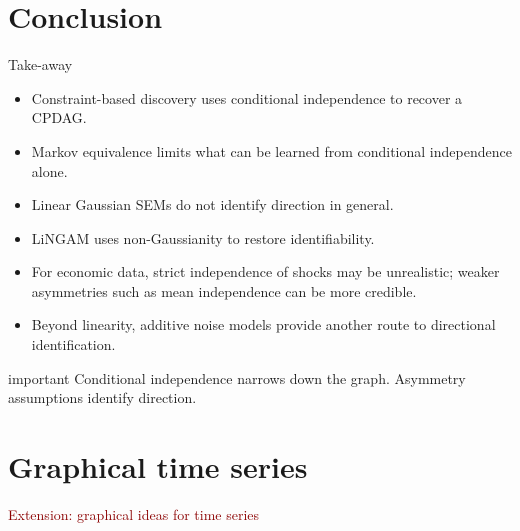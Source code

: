 \documentclass[dvipsnames,aspectratio=169,handout]{beamer}
\begin{document}

\section{Conclusion}

\begin{frame}{Take-away}
\begin{itemize}
    \item Constraint-based discovery uses conditional independence to recover a CPDAG.
    \item Markov equivalence limits what can be learned from conditional independence alone.
    \item Linear Gaussian SEMs do not identify direction in general.
    \item LiNGAM uses non-Gaussianity to restore identifiability.
    \item For economic data, strict independence of shocks may be unrealistic; weaker asymmetries such as mean independence can be more credible.
    \item Beyond linearity, additive noise models provide another route to directional identification.
\end{itemize}

\vspace{2mm}
\begin{beamercolorbox}[wd=\textwidth,sep=8pt,center,rounded=true,shadow=true]{important}
Conditional independence narrows down the graph.  
Asymmetry assumptions identify direction.
\end{beamercolorbox}
\end{frame}


\section{Graphical time series}

\begin{frame}{}
\begin{center}
{\Huge \textcolor{DarkRed}{Extension: graphical ideas for time series}}
\end{center}
\end{frame}
\end{document}
